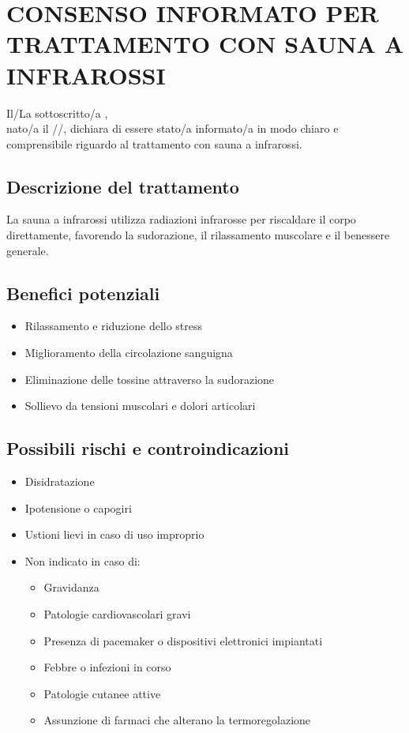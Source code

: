 \newpage

\section{CONSENSO INFORMATO PER TRATTAMENTO CON SAUNA A INFRAROSSI}

\vspace{1em}

Il/La sottoscritto/a \underline{\hspace{7cm}},\\ nato/a il \underline{\hspace{1.5cm}}/\underline{\hspace{1.5cm}}/\underline{\hspace{2cm}}, dichiara di essere stato/a informato/a in modo chiaro e comprensibile riguardo al trattamento con sauna a infrarossi.

\subsection*{Descrizione del trattamento}
La sauna a infrarossi utilizza radiazioni infrarosse per riscaldare il corpo direttamente, favorendo la sudorazione, il rilassamento muscolare e il benessere generale.

\subsection*{Benefici potenziali}
\begin{itemize}
\item Rilassamento e riduzione dello stress
\item Miglioramento della circolazione sanguigna
\item Eliminazione delle tossine attraverso la sudorazione
\item Sollievo da tensioni muscolari e dolori articolari
\end{itemize}

\subsection*{Possibili rischi e controindicazioni}
\begin{itemize}
\item Disidratazione
\item Ipotensione o capogiri
\item Ustioni lievi in caso di uso improprio
\item Non indicato in caso di:
\begin{itemize}
\item Gravidanza
\item Patologie cardiovascolari gravi
\item Presenza di pacemaker o dispositivi elettronici impiantati
\item Febbre o infezioni in corso
\item Patologie cutanee attive
\item Assunzione di farmaci che alterano la termoregolazione
\end{itemize}
\end{itemize}

